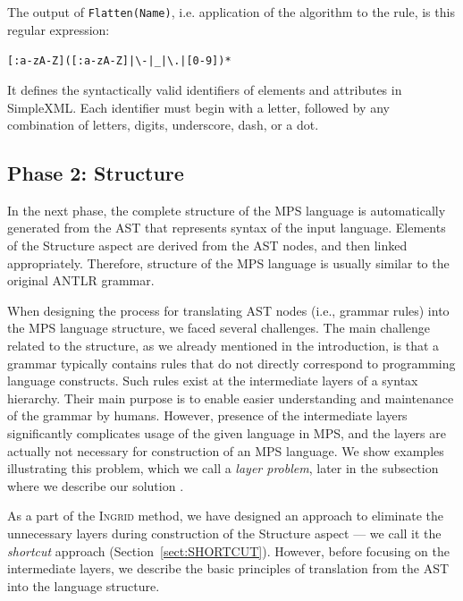 The output of \texttt{Flatten(Name)}, i.e. application of the algorithm to the  rule, is this regular expression:

\begin{center}
  \texttt{[:a-zA-Z]([:a-zA-Z]|\textbackslash-|{\_}|\textbackslash.|[0-9])*}
\end{center}
It defines the syntactically valid identifiers of elements and attributes in SimpleXML.
Each identifier must begin with a letter, followed by any combination of letters, digits, underscore, dash, or a dot.

\subsection{Phase 2: Structure}

In the next phase, the complete structure of the MPS language is automatically generated from the AST that represents syntax of the input language.
Elements of the Structure aspect are derived from the AST nodes, and then linked appropriately.
Therefore, structure of the MPS language is usually similar to the original ANTLR grammar.

When designing the process for translating AST nodes (i.e., grammar rules) into the MPS language structure, we faced several challenges.
The main challenge related to the structure, as we already mentioned in the introduction, is that a grammar typically contains rules that do not directly correspond to programming language constructs.
Such rules exist at the intermediate layers of a syntax hierarchy.
Their main purpose is to enable easier understanding and maintenance of the grammar by humans.
However, presence of the intermediate layers significantly complicates usage of the given language in MPS, and the layers are actually not necessary for construction of an MPS language.
We show examples illustrating this problem, which we call a \emph{layer problem}, later in the subsection where we describe our solution .

As a part of the \textsc{Ingrid} method, we have designed an approach to eliminate the unnecessary layers during construction of the Structure aspect --- we call it the \emph{shortcut} approach (Section~\ref{sect:SHORTCUT}).
However, before focusing on the intermediate layers, we describe the basic principles of translation from the AST into the language structure.

